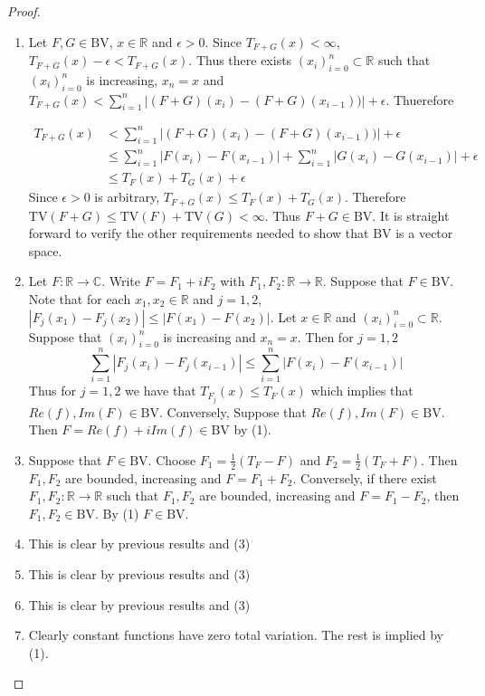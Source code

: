 \documentclass[12pt]{amsart}
\theoremstyle{definition}
\newcommand{\ep}{\epsilon}
\newcommand{\C}{\mathbb{C}}
\newcommand{\R}{\mathbb{R}}
\newcommand{\BV}{\text{BV}}
\newcommand{\TV}{\text{TV}}
\begin{document}
	\begin{proof}
		\begin{enumerate}
			\item Let $F, G \in \BV$, $x \in \R$ and $\ep>0$. Since $T_{F+G}(x) < \infty$, $T_{F+G}(x)-\ep< T_{F+G}(x)$. Thus there exists $(x_i)_{i=0}^n \subset \R$ such that $(x_i)_{i=0}^n$ is increasing, $x_n=x$ and $T_{F+G}(x) < \sum_{i=1}^n |(F+G)(x_i) - (F+G)(x_{i-1}))|+ \ep$. Thuerefore 
			
			\begin{align*}
				T_{F+G}(x)
				& < \sum_{i=1}^n |(F+G)(x_i) - (F+G)(x_{i-1}))|+ \ep\\
				& \leq \sum_{i=1}^n |F(x_i)-F(x_{i-1})|+ \sum_{i=1}^n|G(x_i)-G(x_{i-1})| + \ep\\
				& \leq T_F(x) + T_G(x) + \ep
			\end{align*}
			Since $\ep >0$ is arbitrary, $T_{F+G}(x) \leq T_F(x)+T_G(x)$. Therefore $\TV(F+G) \leq \TV(F)+\TV(G)<\infty$. Thus $F+G \in \BV$. It is straight forward to verify the other requirements needed to show that $\BV$ is a vector space.
			
			\item Let $F: \R \rightarrow \C$. Write $F=F_1+iF_2$ with $F_1, F_2:\R \rightarrow \R$. Suppose that $F \in \BV$. Note that for each $x_1,x_2 \in \R$ and $j =1,2$, $|F_j(x_1)-F_j(x_2)| \leq |F(x_1)-F(x_2)|$. Let $x\in \R$ and $(x_i)_{i=0}^n \subset \R$. Suppose that $(x_i)_{i=0}^n$ is increasing and $x_n=x$. Then for $j=1,2$ 
			$$\sum_{i=1}^n|F_j(x_i)-F_j(x_{i-1})| \leq \sum_{i=1}^n|F(x_i)-F(x_{i-1})|$$
			Thus for $j=1,2$ we have that $T_{F_j}(x) \leq T_F(x)$ which implies that $Re(f),Im(F) \in \BV$. Conversely, Suppose that $Re(f), Im(F) \in \BV$. Then $F=Re(f)+iIm(f) \in \BV$ by (1).
			\item Suppose that $F \in \BV$. Choose $F_1=\frac{1}{2}(T_F-F)$ and $F_2=\frac{1}{2}(T_F+F)$. Then $F_1,F_2$ are bounded, increasing and $F=F_1+F_2$. Conversely, if there exist $F_1,F_2:\R \rightarrow \R$ such that $F_1,F_2$ are bounded, increasing and $F=F_1-F_2$, then $F_1, F_2 \in \BV$. By (1) $F \in \BV$.
			\item This is clear by previous results and (3)
			\item This is clear by previous results and (3)
			\item This is clear by previous results and (3)
			\item Clearly constant functions have zero total variation. The rest is implied by (1).
		\end{enumerate}
	\end{proof}
	
\end{document}
